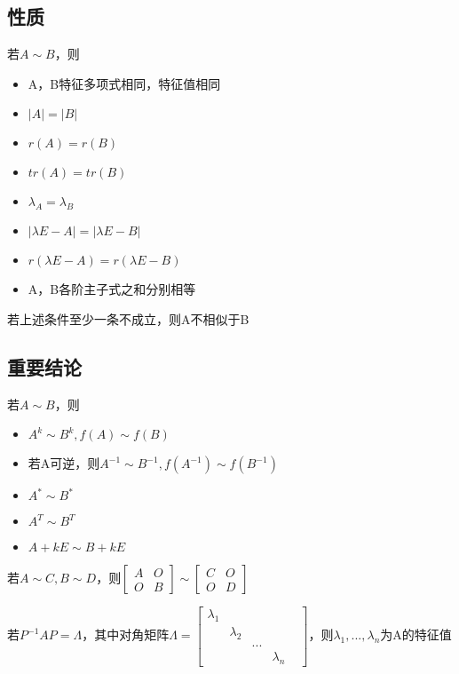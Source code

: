\subsection{性质}
若\(A \sim B\)，则
\begin{itemize}
    \item A，B特征多项式相同，特征值相同
    \item \(|A| = |B|\)
    \item \(r(A) = r(B)\)
    \item \(tr(A) = tr(B)\)
    \item \(\lambda_A = \lambda_B\)
    \item \(|\lambda E - A| = |\lambda E - B|\)
    \item \(r(\lambda E - A) = r(\lambda E - B)\)
    \item A，B各阶主子式之和分别相等
\end{itemize}
若上述条件至少一条不成立，则A不相似于B

\subsection{重要结论}
若\(A \sim B\)，则
\begin{itemize}
    \item \(A^k \sim B^k, f(A) \sim f(B)\)
    \item 若A可逆，则\(A^{-1} \sim B^{-1}, f(A^{-1}) \sim f(B^{-1})\)
    \item \(A^* \sim B^*\)
    \item \(A^T \sim B^T\)
    \item \(A + kE \sim B + kE\)
\end{itemize}

若\(A \sim C, B \sim D\)，则\(\begin{bmatrix}
    A & O \\ 
    O & B
\end{bmatrix} \sim \begin{bmatrix}
    C & O \\ 
    O & D
\end{bmatrix}\)

若\(P^{-1}AP = \Lambda\)，其中对角矩阵\(\Lambda = \begin{bmatrix}
\lambda_1 & & & & \\ 
& \lambda_2 & \\ 
& & ... \\ 
& & & \lambda_n
\end{bmatrix}\)，则\(\lambda_1, ..., \lambda_n\)为A的特征值

